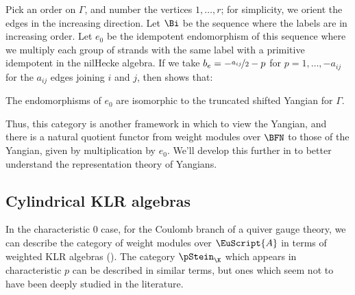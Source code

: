 Pick an order on $\Gamma$, and number the vertices $1,\dots, r$; for
simplicity, we orient the edges in the increasing direction. Let $\Bi$
be the sequence where the labels are in increasing order.  Let $e_0$
be the idempotent endomorphism of this sequence where we multiply each
group of strands with the same label with a primitive idempotent in
the nilHecke algebra.
If we take $b_e=-\nicefrac{a_{ij}}{2}-p$ for $p=1,\dots, -a_{ij}$ for
the $a_{ij}$ edges joining $i$ and $j$, then \cite[Thm. B.18]{BFNplus} shows that:
\begin{proposition}
The endomorphisms of $e_0$ are isomorphic to the truncated shifted
Yangian for $\Gamma$.  
\end{proposition}
Thus, this category is another framework in which to view the Yangian,
and there is a natural quotient functor from weight modules over
$\BFN$ to those of the Yangian, given by multiplication by $e_0$.    We'll develop this further in \cite{KTWWY2} to better understand the representation theory of Yangians. 



\subsection{Cylindrical KLR algebras}
\label{sec:definition}

 
 In the characteristic 0 case, for the Coulomb branch of a quiver gauge theory, we can describe the category of weight modules over $\EuScript{A}$ in terms of weighted KLR algebras (\cite[\S 4.4]{WebSD}).  The category $\pStein_\K$ which appears in characteristic $p$ can be described in similar terms, but ones which seem not to have been deeply studied in the literature.  
 
